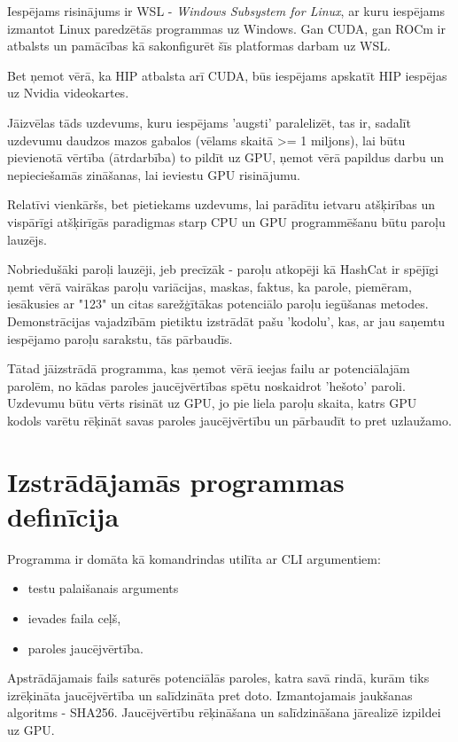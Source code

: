 \documentclass[12pt]{report}%
\theoremstyle{definition}
\begin{document}
Iespējams risinājums ir WSL - \textit{Windows Subsystem for Linux}, ar kuru iespējams izmantot
Linux paredzētās programmas uz Windows. Gan CUDA, gan ROCm ir atbalsts un pamācības kā sakonfigurēt 
šīs platformas darbam uz WSL.\cite{nvidia_wsl_guide,rocm_wsl_guide}







Bet ņemot vērā, ka HIP atbalsta arī CUDA, būs iespējams apskatīt HIP iespējas uz Nvidia videokartes.

Jāizvēlas tāds uzdevums, kuru iespējams 'augsti' paralelizēt, tas ir, sadalīt uzdevumu daudzos mazos gabalos (vēlams skaitā >= 1 miljons),
lai būtu pievienotā vērtība (ātrdarbība) to pildīt uz GPU, ņemot vērā papildus darbu un nepieciešamās zināšanas, lai ieviestu GPU risinājumu.

Relatīvi vienkāršs, bet pietiekams uzdevums, lai parādītu ietvaru atšķirības un vispārīgi atšķirīgās
paradigmas starp CPU un GPU programmēšanu būtu paroļu lauzējs.

Nobriedušāki paroļi lauzēji, jeb precīzāk - paroļu atkopēji kā HashCat ir spējīgi ņemt vērā vairākas paroļu
variācijas, maskas, faktus, ka parole, piemēram, iesākusies ar "123" un citas sarežģītākas potenciālo paroļu
iegūšanas metodes. Demonstrācijas vajadzībām pietiktu izstrādāt pašu 'kodolu', kas, ar jau saņemtu
iespējamo paroļu sarakstu, tās pārbaudīs.


Tātad jāizstrādā programma, kas ņemot vērā ieejas failu ar potenciālajām parolēm, no kādas paroles
jaucējvērtības spētu noskaidrot 'hešoto' paroli.
Uzdevumu būtu vērts risināt uz GPU, jo pie liela paroļu skaita, katrs GPU kodols varētu rēķināt savas
paroles jaucējvērtību un pārbaudīt to pret uzlaužamo.

\section{Izstrādājamās programmas definīcija}
Programma ir domāta kā komandrindas utilīta ar CLI argumentiem:
\begin{itemize}
  \item testu palaišanais arguments
  \item ievades faila ceļš,
  \item paroles jaucējvērtība.
\end{itemize}

Apstrādājamais fails saturēs potenciālās paroles, katra savā rindā, kurām tiks izrēķināta jaucējvērtība un
salīdzināta pret doto. Izmantojamais jaukšanas algoritms - SHA256. Jaucējvērtību rēķināšana un salīdzināšana
jārealizē izpildei uz GPU.
\end{document}
